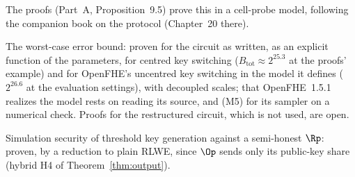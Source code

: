 
The proofs (Part~A, Proposition~9.5) prove this in a cell-probe model, following the companion book on the protocol (Chapter~20 there).

\item The worst-case error bound: proven for the circuit as written, as an explicit function of the parameters, for centred key switching ($B_{\mathrm{tot}} \approx 2^{25.3}$ at the proofs' example) and for OpenFHE's uncentred key switching in the model it defines ($2^{26.6}$ at the evaluation settings), with decoupled scales; that OpenFHE~1.5.1 realizes the model rests on reading its source, and (M5) for its sampler on a numerical check. Proofs for the restructured circuit, which is not used, are open.

\item Simulation security of threshold key generation against a semi-honest $\Rp$: proven, by a reduction to plain RLWE, since $\Op$ sends only its public-key share (hybrid H4 of Theorem~\ref{thm:output}).

